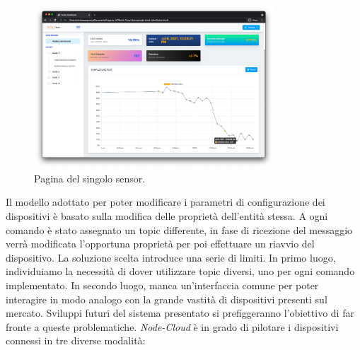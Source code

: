 \documentclass{article}
\begin{document}
\begin{figure}[H]
    \centering
     \includegraphics[width=0.80\textwidth]{sensor-page.png}
    \caption{Pagina del singolo sensor.}
    \label{fig:sensor-page}
\end{figure}
Il modello adottato per poter modificare i parametri di configurazione dei dispositivi è basato sulla modifica delle proprietà dell’entità stessa. A ogni comando è stato assegnato un topic differente, in fase di ricezione del messaggio verrà modificata l’opportuna proprietà per poi effettuare un riavvio del dispositivo.
La soluzione scelta introduce una serie di limiti. In primo luogo, individuiamo la necessità di dover utilizzare topic diversi, uno per ogni comando implementato. In secondo luogo, manca un’interfaccia comune per poter interagire in modo analogo con la grande vastità di dispositivi presenti sul mercato. Sviluppi futuri del sistema presentato si prefiggeranno l’obiettivo di far fronte a queste problematiche.
\emph{Node-Cloud} è in grado di pilotare i dispositivi connessi in tre diverse modalità:
\clearpage
\end{document}
